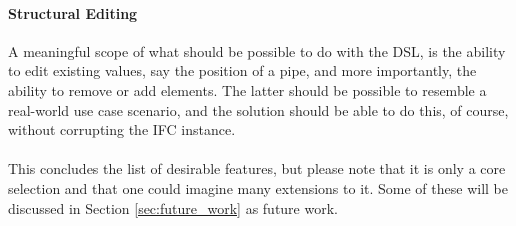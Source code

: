 \paragraph{Structural Editing}
A meaningful scope of what should be possible to do with the DSL, is the ability to edit existing values, say the position of a pipe, and more importantly, the ability to remove or add elements. The latter should be possible to resemble a real-world use case scenario, and the solution should be able to do this, of course, without corrupting the IFC instance.
\paragraph{}
This concludes the list of desirable features, but please note that it is only a core selection and that one could imagine many extensions to it. Some of these will be discussed in Section \ref{sec:future_work} as future work. 

